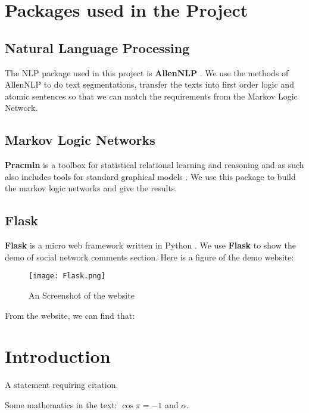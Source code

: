 \documentclass[
12pt, %
a4paper, %
oneside, %
headinclude,footinclude, %
BCOR5mm, %
]{scrartcl}
\begin{document}
\section{Packages used in the Project}
\subsection{Natural Language Processing}
The NLP package used in this project is \textbf{AllenNLP} \cite{Gardner2017AllenNLP}. We use the methods of AllenNLP to do text segmentations, transfer the texts into first order logic and atomic sentences so that we can match the requirements from the Markov Logic Network.

\subsection{Markov Logic Networks}
\textbf{Pracmln} is a toolbox for statistical relational learning and reasoning and as such also includes tools for standard graphical models \cite{pracmln}. We use this package to build the markov logic networks and give the results.
\subsection{Flask}
\textbf{Flask} is a micro web framework written in Python 
\cite{grinberg2018flask}. We use \textbf{Flask} to show the demo of social network comments section. Here is a figure of the demo website:
\begin{figure}[tb]
    \centering 
    \texttt{[image: Flask.png]} 
    \caption[An Screenshot of the website]{An Screenshot of the website} %
    \end{figure}
From the website, we can find that:

\section{Introduction}

A statement requiring citation.

\lipsum[1-3] %

Some mathematics in the text: $\cos\pi=-1$ and $\alpha$.
 
\end{document}

